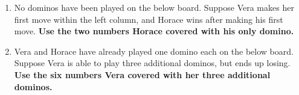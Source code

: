 \begin{puzzle}
\begin{enumerate}
\vfill
\newpage
  \item
    No dominos have been played on the below board.
    Suppose Vera makes her first move within the left column,
    and Horace wins after making his first move.
    \textbf{Use the two numbers Horace covered with his only domino.}
    \begin{center}
    \end{center}
    \begin{center}
    \end{center}

\vfill

  \item
    Vera and Horace have already played one domino each on the below board.
    Suppose Vera is able to play three additional dominos, but ends up losing.
    \textbf{Use the six numbers Vera covered with her
    three additional dominos.}
    \begin{center}
    \end{center}
    \begin{center}
    \end{center}

\vfill


\end{enumerate}
\end{puzzle}
